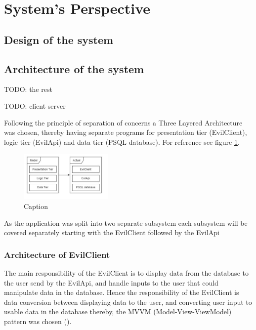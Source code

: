 \documentclass[report/main.tex]{subfiles}
\begin{document}
    \section{System's Perspective}
    \label{Sec:systems_perspective}
    
    \subsection{Design of the system}
    \label{subsec:design_of_system}

    \subsection{Architecture of the system}
    \label{subsec:architecture_of_system}
        TODO: the rest
        
        TODO: client server
        
        Following the principle of separation of concerns a Three Layered Architecture was chosen, thereby having separate programs for presentation tier (EvilClient), logic tier (EvilApi) and data tier (PSQL database). For reference see figure \ref{fig:three_layered:architecture}.
        

        \begin{figure}
            \centering
            \includegraphics[width=0.4\textwidth]{report/images/MiniTwit-Three Layered Architecture.jpg}
            \caption{Caption}
            \label{fig:three_layered:architecture}
        \end{figure}

        As the application was split into two separate subsystem each subsystem will be covered separately starting with the EvilClient followed by the EvilApi
        
        \subsubsection{Architecture of EvilClient}
        \label{subsubsec:architexture_of_evilclient}
            The main responsibility of the EvilClient is to display data from the database to the user send by the EvilApi, and handle inputs to the user that could manipulate data in the database. Hence the responsibility of the EvilClient is data conversion between displaying data to the user, and converting user input to usable data in the database thereby, the MVVM (Model-View-ViewModel) pattern was chosen (\cite{ms-mvvm}).
            
\end{document}
